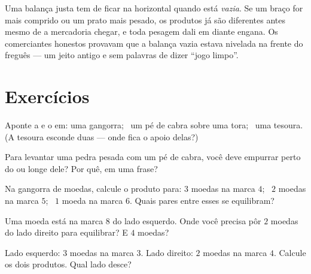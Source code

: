 \begin{remark}\label{rem:g3:levers-and-scales:fair}
Uma balança justa tem de ficar na horizontal quando está
\emph{vazia}. Se um braço for mais comprido ou um prato mais pesado,
os produtos já são diferentes antes mesmo de a mercadoria chegar, e
toda pesagem dali em diante engana. Os comerciantes honestos provavam
que a balança vazia estava nivelada na frente do freguês --- um jeito
antigo e sem palavras de dizer ``jogo limpo''.
\end{remark}

\section{Exercícios}

\begin{exercise}[$\star$]\label{exo:g3:levers-and-scales:1}
Aponte a  e o  em: uma gangorra; \ um pé de
cabra sobre uma tora; \ uma tesoura. (A tesoura esconde duas
 --- onde fica o apoio delas?)
\end{exercise}

\begin{exercise}[$\star$]\label{exo:g3:levers-and-scales:2}
Para levantar uma pedra pesada com um pé de cabra, você deve empurrar
perto do  ou longe dele? Por quê, em uma frase?
\end{exercise}

\begin{exercise}[$\star$]\label{exo:g3:levers-and-scales:3}
Na gangorra de moedas, calcule o produto para: $3$ moedas na marca
$4$; \ $2$ moedas na marca $5$; \ $1$ moeda na marca $6$. Quais
pares entre esses se equilibram?
\end{exercise}

\begin{exercise}[$\star$]\label{exo:g3:levers-and-scales:4}
Uma moeda está na marca $8$ do lado esquerdo. Onde você precisa pôr
$2$ moedas do lado direito para equilibrar? E $4$ moedas?
\end{exercise}

\begin{exercise}[$\star$]\label{exo:g3:levers-and-scales:5}
Lado esquerdo: $3$ moedas na marca $3$. Lado direito: $2$ moedas na
marca $4$. Calcule os dois produtos. Qual lado desce?
\end{exercise}

